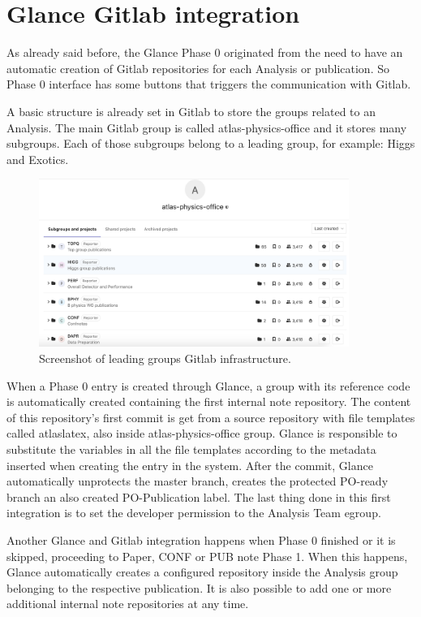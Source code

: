 \section{Glance Gitlab integration}
\label{sec:glance-gitlab-integration}

As already said before, the Glance Phase 0 originated from the need to have an automatic creation of Gitlab repositories for each Analysis or publication. So Phase 0 interface has some buttons that triggers the communication with Gitlab.

A basic structure is already set in Gitlab to store the groups related to an Analysis. The main Gitlab group is called atlas-physics-office and it stores many subgroups. Each of those subgroups belong to a leading group, for example: Higgs and Exotics.

\begin{figure}[ht!]
  \centering
  \includegraphics[width=0.9\textwidth]{po-lead-groups-tree.png}
  \caption{Screenshot of leading groups Gitlab infrastructure.}
  \label{fig:po-lead-groups-tree}
\end{figure}

When a Phase 0 entry is created through Glance, a group with its reference code is automatically created containing the first internal note repository. The content of this repository's first commit is get from a source repository with file templates called atlaslatex, also inside atlas-physics-office group. Glance is responsible to substitute the variables in all the file templates according to the metadata inserted when creating the entry in the system. After the commit, Glance automatically unprotects the master branch, creates the protected PO-ready branch an also created PO-Publication label. The last thing done in this first integration is to set the developer permission to the Analysis Team egroup.

Another Glance and Gitlab integration happens when Phase 0 finished or it is skipped, proceeding to Paper, CONF or PUB note Phase 1. When this happens, Glance automatically creates a configured repository inside the Analysis group belonging to the respective publication. It is also possible to add one or more additional internal note repositories at any time.

